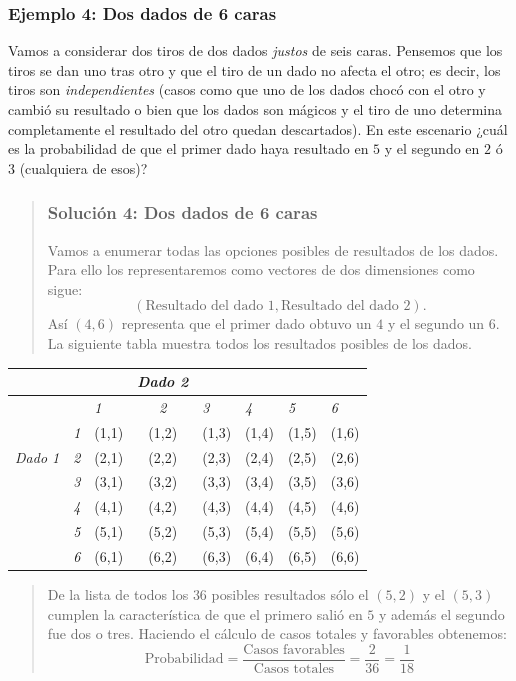 \documentclass[
]{book}
\newenvironment{Ejemplo}
{\begin{mdframed}[
  linecolor=ejemplocolor,
  skipabove=12pt,
  skipbelow=12pt,
  roundcorner=20pt,
  splittopskip=2\topsep]}
{\end{mdframed}}
\begin{document}
\begin{Ejemplo}
\hypertarget{ejemplo-4-dos-dados-de-6-caras}{%
\subsubsection{Ejemplo 4: Dos dados de 6
caras}\label{ejemplo-4-dos-dados-de-6-caras}}

Vamos a considerar dos tiros de dos dados \emph{justos} de seis caras.
Pensemos que los tiros se dan uno tras otro y que el tiro de un dado no
afecta el otro; es decir, los tiros son \emph{independientes} (casos
como que uno de los dados chocó con el otro y cambió su resultado o bien
que los dados son mágicos y el tiro de uno determina completamente el
resultado del otro quedan descartados). En este escenario ¿cuál es la
probabilidad de que el primer dado haya resultado en \(5\) y el segundo
en \(2\) ó \(3\) (cualquiera de esos)?

\begin{quote}
\hypertarget{soluciuxf3n-4-dos-dados-de-6-caras}{%
\subsubsection{Solución 4: Dos dados de 6
caras}\label{soluciuxf3n-4-dos-dados-de-6-caras}}

Vamos a enumerar todas las opciones posibles de resultados de los dados.
Para ello los representaremos como vectores de dos dimensiones como
sigue: \[
(\text{Resultado del dado 1}, \text{Resultado del dado 2}).
\] Así \((4,6)\) representa que el primer dado obtuvo un \(4\) y el
segundo un \(6\). La siguiente tabla muestra todos los resultados
posibles de los dados.
\end{quote}

\begin{longtable}[]{@{}lclcllll@{}}
\toprule
& & & \emph{Dado 2} & & & &\tabularnewline
\midrule
\endhead
& & \emph{1} & \emph{2} & \emph{3} & \emph{4} & \emph{5} &
\emph{6}\tabularnewline
& \emph{1} & (1,1) & (1,2) & (1,3) & (1,4) & (1,5) &
(1,6)\tabularnewline
\emph{Dado 1} & \emph{2} & (2,1) & (2,2) & (2,3) & (2,4) & (2,5) &
(2,6)\tabularnewline
& \emph{3} & (3,1) & (3,2) & (3,3) & (3,4) & (3,5) &
(3,6)\tabularnewline
& \emph{4} & (4,1) & (4,2) & (4,3) & (4,4) & (4,5) &
(4,6)\tabularnewline
& \emph{5} & (5,1) & (5,2) & (5,3) & (5,4) & (5,5) &
(5,6)\tabularnewline
& \emph{6} & (6,1) & (6,2) & (6,3) & (6,4) & (6,5) &
(6,6)\tabularnewline
\bottomrule
\end{longtable}

\begin{quote}
De la lista de todos los \(36\) posibles resultados sólo el \((5,2)\) y
el \((5,3)\) cumplen la característica de que el primero salió en \(5\)
y además el segundo fue dos o tres. Haciendo el cálculo de casos totales
y favorables obtenemos: \[
\textrm{Probabilidad} = \dfrac{\text{Casos favorables}}{\text{Casos totales}} = \dfrac{2}{36} = \dfrac{1}{18}
\]
\end{quote}
\end{Ejemplo}
\end{document}
